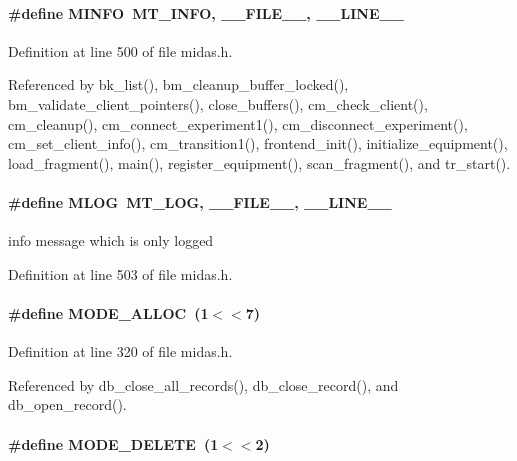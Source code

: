 \paragraph[{MINFO}]{\setlength{\rightskip}{0pt plus 5cm}\#define MINFO~MT\_\-INFO,  \_\-\_\-FILE\_\-\_\-, \_\-\_\-LINE\_\-\_\-}\hfill\label{group__mdefineh_ga6e27d8876a43afce3ee4dd16527cbb9e}

\begin{DoxyItemize}
\item 
\end{DoxyItemize}

Definition at line 500 of file midas.h.

Referenced by bk\_\-list(), bm\_\-cleanup\_\-buffer\_\-locked(), bm\_\-validate\_\-client\_\-pointers(), close\_\-buffers(), cm\_\-check\_\-client(), cm\_\-cleanup(), cm\_\-connect\_\-experiment1(), cm\_\-disconnect\_\-experiment(), cm\_\-set\_\-client\_\-info(), cm\_\-transition1(), frontend\_\-init(), initialize\_\-equipment(), load\_\-fragment(), main(), register\_\-equipment(), scan\_\-fragment(), and tr\_\-start().
\paragraph[{MLOG}]{\setlength{\rightskip}{0pt plus 5cm}\#define MLOG~MT\_\-LOG,   \_\-\_\-FILE\_\-\_\-, \_\-\_\-LINE\_\-\_\-}\hfill\label{group__mdefineh_ga953a810cf5034c603bdcad8840223ddc}
info message which is only logged 

Definition at line 503 of file midas.h.
\paragraph[{MODE\_\-ALLOC}]{\setlength{\rightskip}{0pt plus 5cm}\#define MODE\_\-ALLOC~(1$<$$<$7)}\hfill\label{group__mdefineh_ga72d0dc16c011341c24d819b0b9f330ad}


Definition at line 320 of file midas.h.

Referenced by db\_\-close\_\-all\_\-records(), db\_\-close\_\-record(), and db\_\-open\_\-record().
\paragraph[{MODE\_\-DELETE}]{\setlength{\rightskip}{0pt plus 5cm}\#define MODE\_\-DELETE~(1$<$$<$2)}\hfill\label{group__mdefineh_ga75f614b7ebb2b887b9e8f13c1b53ca6f}


